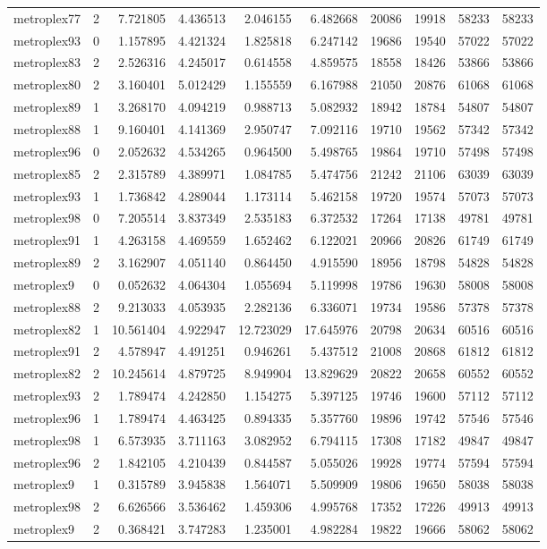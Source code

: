\begin{longtable}{|l|r|r|r|r|r|r|r|r|r|}
metroplex77 & 2 & 7.721805 & 4.436513 & 2.046155 & 6.482668 & 20086 & 19918 & 58233 & 58233 \\
metroplex93 & 0 & 1.157895 & 4.421324 & 1.825818 & 6.247142 & 19686 & 19540 & 57022 & 57022 \\
metroplex83 & 2 & 2.526316 & 4.245017 & 0.614558 & 4.859575 & 18558 & 18426 & 53866 & 53866 \\
metroplex80 & 2 & 3.160401 & 5.012429 & 1.155559 & 6.167988 & 21050 & 20876 & 61068 & 61068 \\
metroplex89 & 1 & 3.268170 & 4.094219 & 0.988713 & 5.082932 & 18942 & 18784 & 54807 & 54807 \\
metroplex88 & 1 & 9.160401 & 4.141369 & 2.950747 & 7.092116 & 19710 & 19562 & 57342 & 57342 \\
metroplex96 & 0 & 2.052632 & 4.534265 & 0.964500 & 5.498765 & 19864 & 19710 & 57498 & 57498 \\
metroplex85 & 2 & 2.315789 & 4.389971 & 1.084785 & 5.474756 & 21242 & 21106 & 63039 & 63039 \\
metroplex93 & 1 & 1.736842 & 4.289044 & 1.173114 & 5.462158 & 19720 & 19574 & 57073 & 57073 \\
metroplex98 & 0 & 7.205514 & 3.837349 & 2.535183 & 6.372532 & 17264 & 17138 & 49781 & 49781 \\
metroplex91 & 1 & 4.263158 & 4.469559 & 1.652462 & 6.122021 & 20966 & 20826 & 61749 & 61749 \\
metroplex89 & 2 & 3.162907 & 4.051140 & 0.864450 & 4.915590 & 18956 & 18798 & 54828 & 54828 \\
metroplex9 & 0 & 0.052632 & 4.064304 & 1.055694 & 5.119998 & 19786 & 19630 & 58008 & 58008 \\
metroplex88 & 2 & 9.213033 & 4.053935 & 2.282136 & 6.336071 & 19734 & 19586 & 57378 & 57378 \\
metroplex82 & 1 & 10.561404 & 4.922947 & 12.723029 & 17.645976 & 20798 & 20634 & 60516 & 60516 \\
metroplex91 & 2 & 4.578947 & 4.491251 & 0.946261 & 5.437512 & 21008 & 20868 & 61812 & 61812 \\
metroplex82 & 2 & 10.245614 & 4.879725 & 8.949904 & 13.829629 & 20822 & 20658 & 60552 & 60552 \\
metroplex93 & 2 & 1.789474 & 4.242850 & 1.154275 & 5.397125 & 19746 & 19600 & 57112 & 57112 \\
metroplex96 & 1 & 1.789474 & 4.463425 & 0.894335 & 5.357760 & 19896 & 19742 & 57546 & 57546 \\
metroplex98 & 1 & 6.573935 & 3.711163 & 3.082952 & 6.794115 & 17308 & 17182 & 49847 & 49847 \\
metroplex96 & 2 & 1.842105 & 4.210439 & 0.844587 & 5.055026 & 19928 & 19774 & 57594 & 57594 \\
metroplex9 & 1 & 0.315789 & 3.945838 & 1.564071 & 5.509909 & 19806 & 19650 & 58038 & 58038 \\
metroplex98 & 2 & 6.626566 & 3.536462 & 1.459306 & 4.995768 & 17352 & 17226 & 49913 & 49913 \\
metroplex9 & 2 & 0.368421 & 3.747283 & 1.235001 & 4.982284 & 19822 & 19666 & 58062 & 58062 \\
\end{longtable}
